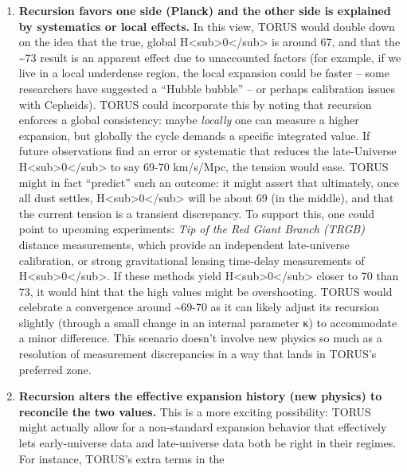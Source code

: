 \documentclass[
]{article}
\begin{document}
\begin{enumerate}
\def\labelenumi{\arabic{enumi}.}
\item
  \textbf{Recursion favors one side (Planck) and the other side is
  explained by systematics or local effects.} In this view, TORUS would
  double down on the idea that the true, global
  H\textless sub\textgreater0\textless/sub\textgreater{} is around 67,
  and that the \textasciitilde73 result is an apparent effect due to
  unaccounted factors (for example, if we live in a local underdense
  region, the local expansion could be faster -- some researchers have
  suggested a ``Hubble bubble'' -- or perhaps calibration issues with
  Cepheids). TORUS could incorporate this by noting that recursion
  enforces a global consistency: maybe \emph{locally} one can measure a
  higher expansion, but globally the cycle demands a specific integrated
  value. If future observations find an error or systematic that reduces
  the late-Universe
  H\textless sub\textgreater0\textless/sub\textgreater{} to say 69-70
  km/s/Mpc, the tension would ease. TORUS might in fact ``predict'' such
  an outcome: it might assert that ultimately, once all dust settles,
  H\textless sub\textgreater0\textless/sub\textgreater{} will be about
  69 (in the middle)\hspace{0pt}, and that the current tension is a
  transient discrepancy. To support this, one could point to upcoming
  experiments: \emph{Tip of the Red Giant Branch (TRGB)} distance
  measurements, which provide an independent late-universe calibration,
  or strong gravitational lensing time-delay measurements of
  H\textless sub\textgreater0\textless/sub\textgreater. If these methods
  yield H\textless sub\textgreater0\textless/sub\textgreater{} closer to
  70 than 73, it would hint that the high values might be overshooting.
  TORUS would celebrate a convergence around \textasciitilde69-70 as it
  can likely adjust its recursion slightly (through a small change in an
  internal parameter κ) to accommodate a minor difference\hspace{0pt}.
  This scenario doesn't involve new physics so much as a resolution of
  measurement discrepancies in a way that lands in TORUS's preferred
  zone.
\item
  \textbf{Recursion alters the effective expansion history (new physics)
  to reconcile the two values.} This is a more exciting possibility:
  TORUS might actually allow for a non-standard expansion behavior that
  effectively lets early-universe data and late-universe data both be
  right in their regimes. For instance, TORUS's extra terms in the

\end{enumerate}
\end{document}
